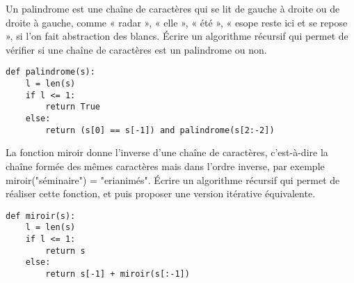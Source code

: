 \documentclass[12pt,fleqn]{article} %
\begin{document}
\begin{exercise}
	Un palindrome est une chaîne de caractères qui se lit de gauche à droite ou de droite à gauche, comme « radar », « elle », « été », « esope reste ici et se repose », si l’on fait abstraction des blancs. Écrire un algorithme récursif qui permet de vérifier si une chaîne de caractères est un palindrome ou non.
		\begin{center}
		\begin{varwidth}[t]{.5\textwidth}
			\begin{lstlisting}[language=iPython,linewidth = 13cm]
def palindrome(s):
	l = len(s)
	if l <= 1:
		return True
	else:
		return (s[0] == s[-1]) and palindrome(s[2:-2])
	\end{lstlisting}\end{varwidth}\end{center}
\end{exercise}

\begin{exercise}
	La fonction miroir donne l’inverse d’une chaîne de caractères, c’est-à-dire la chaîne formée des mêmes caractères mais dans l’ordre inverse, par exemple
	miroir("séminaire") = "erianimés". Écrire un algorithme récursif qui permet de réaliser cette fonction, et puis proposer une version itérative équivalente.
		\begin{center}
		\begin{varwidth}[t]{.5\textwidth}
			\begin{lstlisting}[language=iPython,linewidth = 13cm]
def miroir(s):
	l = len(s)
	if l <= 1:
		return s
	else:
		return s[-1] + miroir(s[:-1])
	\end{lstlisting}\end{varwidth}\end{center}
\end{exercise}
\end{document}
